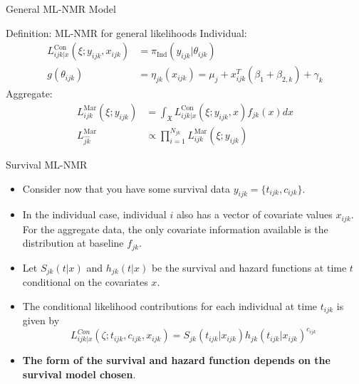 \documentclass{beamer}
\begin{document}
\begin{frame}{General ML-NMR Model}
    \begin{block}{Definition: ML-NMR for general likelihoods}
    Individual:
    \begin{align}
        L_{ijk|x}^{\text{Con}}(\xi;y_{ijk},x_{ijk}) &= \pi_{\text{Ind}}(y_{ijk}|\theta_{ijk}) \\
        g(\theta_{ijk}) &= \eta_{jk}(x_{ijk}) = \mu_j + x_{ijk}^T(\beta_1 + \beta_{2,k}) + \gamma_k \label{mlnmragg}
    \end{align}
    Aggregate:
    \begin{align}
        L_{ijk}^{\text{Mar}}(\xi; y_{ijk}) &= \int_{\mathfrak{X}} L_{ijk|x}^{\text{Con}}(\xi; y_{ijk}, x)f_{jk}(x)dx \label{mlnnmrint}\\
        L_{\hat{jk}}^{\text{Mar}} &\propto \prod_{i = 1}^{N_{jk}}L_{ijk}^{\text{Mar}}(\xi; y_{ijk})
    \end{align}
    \end{block}
\end{frame}

\begin{frame}{Survival ML-NMR}
    \begin{itemize}
        \item Consider now that you have some survival data $y_{ijk} = \{t_{ijk}, c_{ijk}\}$. 
        \pause
        \item In the individual case, individual $i$ also has a vector of covariate values $x_{ijk}$. For the aggregate data, the only covariate information available is the distribution at baseline $f_{jk}$. 
        \pause 
        \item Let $S_{jk}(t|x)$ and $h_{jk}(t|x)$ be the survival and hazard functions at time $t$ conditional on the covariates $x$. 
        \pause
    \item The conditional likelihood contributions for each individual at time $t_{ijk}$ is given by
        \[L_{ijk|x}^{Con}(\zeta;t_{ijk},c_{ijk},x_{ijk}) = S_{jk}(t_{ijk}| x_{ijk})h_{jk}(t_{ijk}|x_{ijk})^{c_{ijk}}\]
        \pause 
        \item \textbf{The form of the survival and hazard function depends on the survival model chosen}.
    \end{itemize}
\end{frame}
\end{document}
